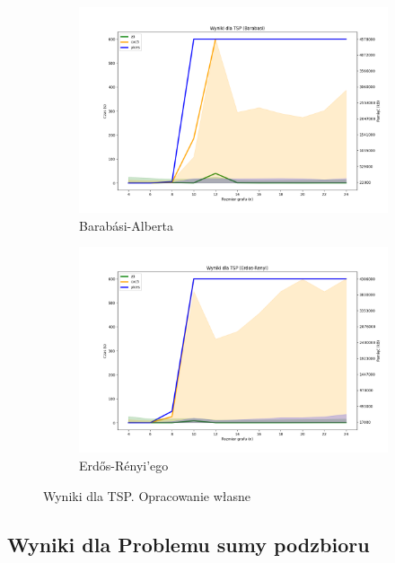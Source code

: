 \begin{figure}[htbp]
	\centering
	\begin{subfigure}[b]{0.45\textwidth}
		\includegraphics[width=\textwidth]{./figures/7-barabasi-plot.png}
		\caption{Barabási-Alberta}
		\label{fig:7-barabasi-plot}
	\end{subfigure}
	\begin{subfigure}[b]{0.45\textwidth}
		\includegraphics[width=\textwidth]{./figures/7-erdos-renyi-plot.png}
		\caption{Erdős-Rényi'ego}
		\label{fig:7-erdos-renyi-plot}
	\end{subfigure}
	\caption{Wyniki dla TSP.  Opracowanie własne}
	\label{fig:7}
\end{figure}

\subsection{Wyniki dla Problemu sumy podzbioru}

